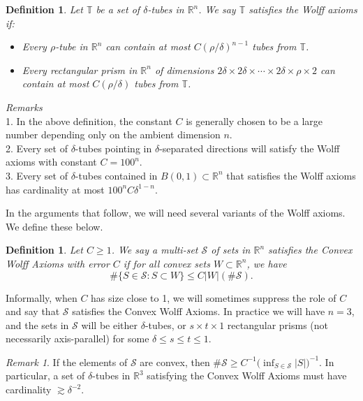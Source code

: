 \documentclass[letterpaper, reqno,11pt]{article}
\numberwithin{equation}{section}
\newcommand{\RR}{\mathbb{R}}
\newcommand{\tubes}{\mathbb{T}}
\numberwithin{thm}{section}
\newtheorem{defn}[thm]{Definition}
\theoremstyle{remark}
\newtheorem{rem}[thm]{Remark}
\begin{document}
\begin{defn}
Let $\tubes$ be a set of $\delta$-tubes in $\RR^n$. We say $\tubes$ satisfies the \emph{Wolff axioms} if:
\begin{itemize}
\item Every $\rho$-tube in $\RR^n$ can contain at most $C(\rho/\delta)^{n-1}$ tubes from $\tubes$.
\item Every rectangular prism in $\RR^n$ of dimensions $2\delta\times 2\delta\times\cdots\times 2\delta\times \rho\times 2$ can contain at most $C(\rho/\delta)$ tubes from $\tubes$.
\end{itemize}
\end{defn}
\noindent\emph{Remarks}\\
1. In the above definition, the constant $C$ is generally chosen to be a large number depending only on the ambient dimension $n$. \\
2. Every set of $\delta$-tubes pointing in $\delta$-separated directions will satisfy the Wolff axioms with constant $C=100^n$. \\
3. Every set of $\delta$-tubes contained in $B(0,1)\subset\RR^n$ that satisfies the Wolff axioms has cardinality at most $100^nC\delta^{1-n}$. 

\medskip

In the arguments that follow, we will need several variants of the Wolff axioms. We define these below. 
\begin{defn}\label{convexWolffAxiomsDefn}
Let $C\geq 1$. We say a multi-set $\mathcal{S}$ of sets in $\RR^n$ satisfies the \emph{Convex Wolff Axioms with error} $C$ if for all convex sets $W\subset\RR^n$, we have
\begin{equation}\label{convexWolff}
\#\{S\in\mathcal{S}\colon S\subset W\} \leq C|W|(\#\mathcal{S}).
\end{equation}
\end{defn}
Informally, when $C$ has size close to 1, we will sometimes suppress the role of $C$ and say that $\mathcal{S}$ satisfies the Convex Wolff Axioms. In practice we will have $n=3$, and the sets in $\mathcal{S}$ will be either $\delta$-tubes, or $s\times t\times 1$ rectangular prisms (not necessarily axis-parallel) for some $\delta\leq s \leq t \leq 1$. 

\begin{rem} If the elements of $\mathcal S$ are convex, then  $\#\mathcal{S}\geq C^{-1}\big(\inf_{S\in\mathcal{S}}|S|\big)^{-1}$. In particular, a set of $\delta$-tubes in $\RR^3$ satisfying the Convex Wolff Axioms must have cardinality $\gtrsim \delta^{-2}$. 
\end{rem}
\end{document}
